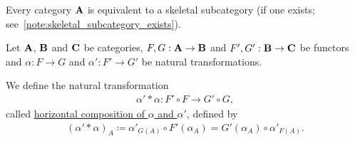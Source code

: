 \begin{proposition}\label{thm:skeletal_subcategory_equivalence}\cite[91]{MacLane1994}
  Every category $\operatorname{\mathbf{A}}$ is equivalent to a skeletal subcategory (if one exists; see~\cref{note:skeletal_subcategory_exists}).
\end{proposition}

\begin{definition}\label{def:natural_transformation_horizontal_composition}\cite[remarks 1.3.24]{Leinster2014}
  Let $\operatorname{\mathbf{A}}$, $\operatorname{\mathbf{B}}$ and $\operatorname{\mathbf{C}}$ be categories, $F, G: \operatorname{\mathbf{A}} \to \operatorname{\mathbf{B}}$ and $F', G': \operatorname{\mathbf{B}} \to \operatorname{\mathbf{C}}$ be functors and $\alpha: F \to G$ and $\alpha': F' \to G'$ be natural transformations.
  \begin{center}
  \end{center}

  We define the natural transformation
  \begin{align*}
    \alpha' * \alpha: F' \circ F \to G' \circ G,
  \end{align*}
  called \ul{horizontal composition of $\alpha$ and $\alpha'$}, defined by
  \begin{align*}
    (\alpha' * \alpha)_A \coloneqq \alpha'_{G(A)} \circ F'(\alpha_A) = G'(\alpha_A) \circ \alpha'_{F(A)}.
  \end{align*}
\end{definition}

